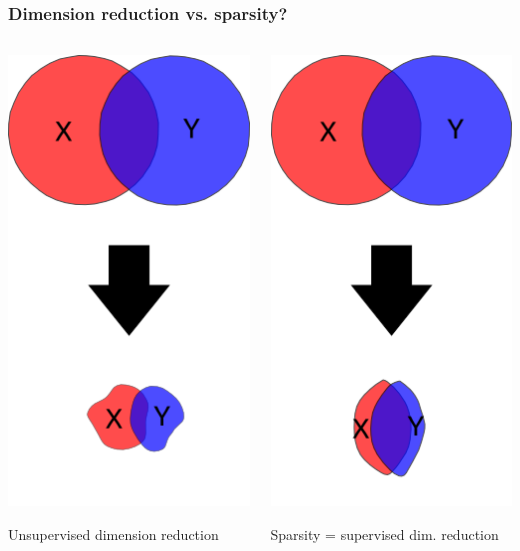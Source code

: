 \documentclass{beamer}
\begin{document}
\begin{frame}
\frametitle{Dimension reduction vs. sparsity?}
\begin{columns}

\begin{column}{0.5\textwidth}
\begin{center}
\includegraphics[scale = 0.5]{reduction_unsup.png}
\end{center}
Unsupervised dimension reduction
\pause
\end{column}

\begin{column}{0.5\textwidth}
\begin{center}
\includegraphics[scale = 0.5]{reduction_sup.png}
\end{center}
Sparsity = supervised dim. reduction
\end{column}


\end{columns}
\end{frame}
\end{document}
